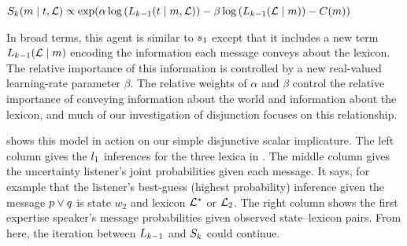 \documentclass{article}
\begin{document}
\begin{examples}  
  \item\label{Sk}%
    $\SpeakerK(\msg \given \state, \Lex) \propto 
    \exp\negthinspace%
    \left(
      \alpha\log\left(\ListenerK[k-1](\state \given \msg, \Lex)\right)
      - 
      \beta\log\left(\ListenerK[k-1](\Lex\given\msg)\right)
      -
      \Costs(\msg)
    \right)$
\end{examples}
%
In broad terms, this agent is similar to $\speakerOne$ except that it
includes a new term $\ListenerK[k-1](\Lex\given\msg)$ encoding the
information each message conveys about the lexicon. The relative
importance of this information is controlled by a new real-valued
learning-rate parameter $\beta$. The relative weights of $\alpha$ and
$\beta$ control the relative importance of conveying information about
the world and information about the lexicon, and much of our
investigation of disjunction focuses on this relationship.

 shows this model in action on our simple
disjunctive scalar implicature. The left column gives the
$\listenerOne$ inferences for the three lexica in
. The middle column gives the uncertainty
listener's joint probabilities given each message. It says, for
example that the listener's best-guess (highest probability) inference
given the message $\porq$ is state $w_{2}$ and lexicon $\LexStar$ or
$\Lex_{2}$. The right column shows the first expertise speaker's
message probabilities given observed state--lexicon pairs. From here,
the iteration between $\ListenerK[k-1]$ and $\SpeakerK$ could
continue.
\end{document}
